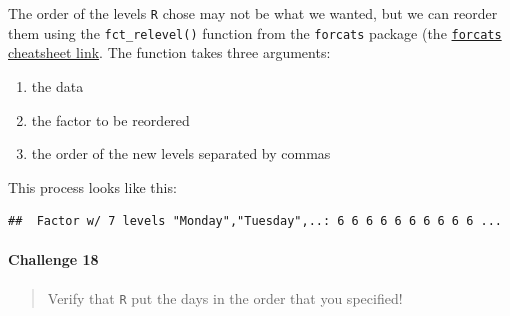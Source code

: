 \documentclass[
  10pt,
  letterpaper,
  twoside,
  openright]{book}
\newenvironment{Shaded}{\begin{snugshade}}{\end{snugshade}}
\newcommand{\AttributeTok}[1]{\textcolor[rgb]{0.13,0.29,0.53}{#1}}
\newcommand{\FunctionTok}[1]{\textcolor[rgb]{0.13,0.29,0.53}{\textbf{#1}}}
\newcommand{\NormalTok}[1]{#1}
\newcommand{\OtherTok}[1]{\textcolor[rgb]{0.56,0.35,0.01}{#1}}
\newcommand{\SpecialCharTok}[1]{\textcolor[rgb]{0.81,0.36,0.00}{\textbf{#1}}}
\newcommand{\StringTok}[1]{\textcolor[rgb]{0.31,0.60,0.02}{#1}}
\providecommand{\tightlist}{%
  \setlength{\itemsep}{0pt}\setlength{\parskip}{0pt}}
\begin{document}
The order of the levels \texttt{R} chose may not be what we wanted, but
we can reorder them using the \texttt{fct\_relevel()} function from the
\texttt{forcats} package (the
\href{https://raw.githubusercontent.com/rstudio/cheatsheets/main/factors.pdf}{\texttt{forcats}
cheatsheet link}. The function takes three arguments:

\begin{enumerate}
\def\labelenumi{\arabic{enumi}.}
\tightlist
\item
  the data
\item
  the factor to be reordered
\item
  the order of the new levels separated by commas
\end{enumerate}

This process looks like this:

\begin{Shaded}
\end{Shaded}

\begin{verbatim}
##  Factor w/ 7 levels "Monday","Tuesday",..: 6 6 6 6 6 6 6 6 6 6 ...
\end{verbatim}

\hypertarget{challenge-18}{%
\paragraph{Challenge 18}\label{challenge-18}}

\begin{quote}
Verify that \texttt{R} put the days in the order that you specified!
\end{quote}
\end{document}
